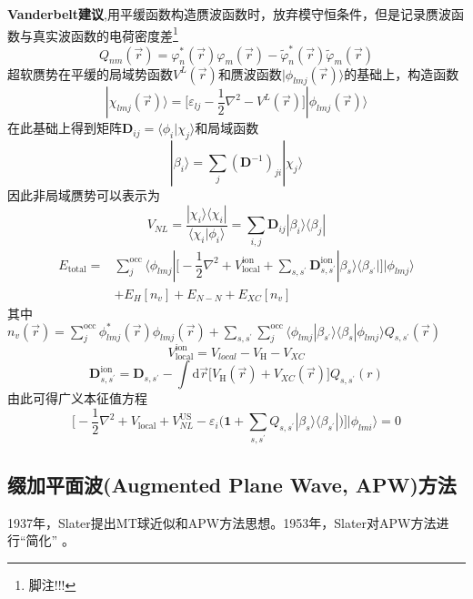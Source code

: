 \textbf{Vanderbelt建议},用平缓函数构造赝波函数时，放弃模守恒条件，但是记录赝波函数与真实波函数的电荷密度差\footnote{脚注!!!}
\begin{equation}
	Q_{nm}(\vec r)=\varphi_n^{\ast}(\vec r)\varphi_m(\vec r)-\tilde\varphi_n^{\ast}(\vec r)\tilde\varphi_m(\vec r)
  \label{eq:uspp_4}
\end{equation}
超软赝势在平缓的局域势函数$V^L(\vec r)$和赝波函数$|\phi_{lmj}(\vec r)\rangle$的基础上，构造函数
\begin{equation}
	|\chi_{lmj}(\vec r)\rangle=\bigg[\varepsilon_{lj}-\dfrac12\nabla^2-V^L(\vec r)\bigg]|\phi_{lmj}(\vec r)\rangle
  \label{eq:uspp_1}
\end{equation}
在此基础上得到矩阵$\mathbf{D}_{ij}=\langle\phi_i|\chi_j\rangle$和局域函数
\begin{equation}
	|\beta_i\rangle=\sum_j(\mathbf{D}^{-1})_{ji}|\chi_{j}\rangle
  \label{eq:uspp_2}
\end{equation}
因此非局域赝势可以表示为
\begin{equation}
	V_{NL}=\dfrac{|\chi_i\rangle\langle\chi_i|}{\langle\chi_i|\phi_i\rangle}=\sum_{i,j}\mathbf{D}_{ij}|\beta_i\rangle\langle\beta_j|
  \label{eq:uspp_3}
\end{equation}
	\begin{equation}
		\begin{aligned}
			E_{\mathrm{total}}=&\sum_j^{\mathrm{occ}}\langle\phi_{lmj}|\bigg[-\dfrac12\nabla^2+V_{\mathrm{local}}^{\mathrm{ion}}+\sum_{s,s^{\prime}}\mathbf{D}_{s,s^{\prime}}^{\mathrm{ion}}|\beta_s\rangle\langle\beta_{s^{\prime}}|\bigg]|\phi_{lmj}\rangle\\
			&+E_{H}[n_v]+E_{N-N}+E_{XC}[n_v]
		\end{aligned}
  \label{eq:uspp_5}
	\end{equation}
其中$n_v(\vec r)=\sum\limits_j^{\mathrm{occ}}\phi_{lmj}^{\ast}(\vec r)\phi_{lmj}(\vec r)+\sum\limits_{s,s^{\prime}}\sum\limits_j^{\mathrm{occ}}\langle\phi_{lmj}|\beta_{s^{\prime}}\rangle\langle\beta_s|\phi_{lmj}\rangle Q_{s,s^{\prime}}(\vec r)$
	$$V_{\mathrm{local}}^{\mathrm{ion}}=V_{local}-V_{\mathrm H}-V_{XC}$$
	$$\mathbf{D}_{s,s^{\prime}}^{\mathrm{ion}}=\mathbf{D}_{s,s^{\prime}}-\int\mathrm{d}\vec r\big[V_{\mathrm{H}}(\vec r)+V_{XC}(\vec r)\big]Q_{s,s^{\prime}}(r)$$
由此可得广义本征值方程
	$$\bigg[-\dfrac12\nabla^2+V_{\mathrm{local}}+V_{NL}^{\mathrm{US}}-\varepsilon_i\bigg(\mathbf{1}+\sum_{s,s^{\prime}}Q_{s,s^{\prime}}|\beta_s\rangle\langle\beta_{s^{\prime}}|\bigg)\bigg]|\phi_{lmi}\rangle=0$$

\subsection{缀加平面波(Augmented Plane Wave, APW)方法}
1937年，Slater提出MT球近似和APW方法思想\cite{PR51-846_1937}。1953年，Slater对APW方法进行“简化”\cite{PR91-528_1953}%
。

